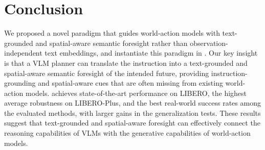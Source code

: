 \section{Conclusion}
\label{sec:conclusion}

We proposed a novel paradigm that guides world-action models with text-grounded and spatial-aware semantic foresight rather than observation-independent text embeddings, and instantiate this paradigm in \ourmethod.
Our key insight is that a VLM planner can translate the instruction into a text-grounded and spatial-aware semantic foresight of the intended future, providing instruction-grounding and spatial-aware cues that are often missing from existing world-action models.
\ourmethod achieves state-of-the-art performance on LIBERO, the highest average robustness on LIBERO-Plus, and the best real-world success rates among the evaluated methods, with larger gains in the generalization tests.
These results suggest that text-grounded and spatial-aware foresight can effectively connect the reasoning capabilities of VLMs with the generative capabilities of world-action models.
